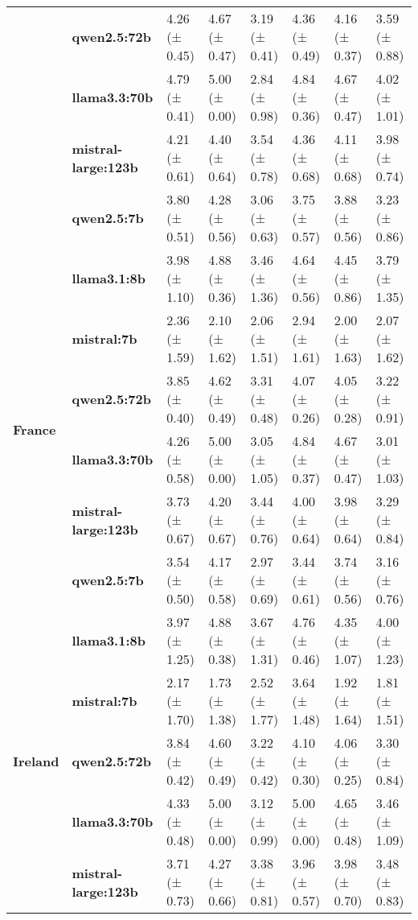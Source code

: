 \begin{longtable}{llllllll}
\textbf{} & \textbf{qwen2.5:72b} & 4.26 (± 0.45) & 4.67 (± 0.47) & 3.19 (± 0.41) & 4.36 (± 0.49) & 4.16 (± 0.37) & 3.59 (± 0.88) \\
\textbf{} & \textbf{llama3.3:70b} & 4.79 (± 0.41) & 5.00 (± 0.00) & 2.84 (± 0.98) & 4.84 (± 0.36) & 4.67 (± 0.47) & 4.02 (± 1.01) \\
\textbf{} & \textbf{mistral-large:123b} & 4.21 (± 0.61) & 4.40 (± 0.64) & 3.54 (± 0.78) & 4.36 (± 0.68) & 4.11 (± 0.68) & 3.98 (± 0.74) \\
\textbf{} & \textbf{qwen2.5:7b} & 3.80 (± 0.51) & 4.28 (± 0.56) & 3.06 (± 0.63) & 3.75 (± 0.57) & 3.88 (± 0.56) & 3.23 (± 0.86) \\
\cline{1-8}
\multirow[t]{6}{*}{\textbf{France}} & \textbf{llama3.1:8b} & 3.98 (± 1.10) & 4.88 (± 0.36) & 3.46 (± 1.36) & 4.64 (± 0.56) & 4.45 (± 0.86) & 3.79 (± 1.35) \\
\textbf{} & \textbf{mistral:7b} & 2.36 (± 1.59) & 2.10 (± 1.62) & 2.06 (± 1.51) & 2.94 (± 1.61) & 2.00 (± 1.63) & 2.07 (± 1.62) \\
\textbf{} & \textbf{qwen2.5:72b} & 3.85 (± 0.40) & 4.62 (± 0.49) & 3.31 (± 0.48) & 4.07 (± 0.26) & 4.05 (± 0.28) & 3.22 (± 0.91) \\
\textbf{} & \textbf{llama3.3:70b} & 4.26 (± 0.58) & 5.00 (± 0.00) & 3.05 (± 1.05) & 4.84 (± 0.37) & 4.67 (± 0.47) & 3.01 (± 1.03) \\
\textbf{} & \textbf{mistral-large:123b} & 3.73 (± 0.67) & 4.20 (± 0.67) & 3.44 (± 0.76) & 4.00 (± 0.64) & 3.98 (± 0.64) & 3.29 (± 0.84) \\
\textbf{} & \textbf{qwen2.5:7b} & 3.54 (± 0.50) & 4.17 (± 0.58) & 2.97 (± 0.69) & 3.44 (± 0.61) & 3.74 (± 0.56) & 3.16 (± 0.76) \\
\cline{1-8}
\multirow[t]{6}{*}{\textbf{Ireland}} & \textbf{llama3.1:8b} & 3.97 (± 1.25) & 4.88 (± 0.38) & 3.67 (± 1.31) & 4.76 (± 0.46) & 4.35 (± 1.07) & 4.00 (± 1.23) \\
\textbf{} & \textbf{mistral:7b} & 2.17 (± 1.70) & 1.73 (± 1.38) & 2.52 (± 1.77) & 3.64 (± 1.48) & 1.92 (± 1.64) & 1.81 (± 1.51) \\
\textbf{} & \textbf{qwen2.5:72b} & 3.84 (± 0.42) & 4.60 (± 0.49) & 3.22 (± 0.42) & 4.10 (± 0.30) & 4.06 (± 0.25) & 3.30 (± 0.84) \\
\textbf{} & \textbf{llama3.3:70b} & 4.33 (± 0.48) & 5.00 (± 0.00) & 3.12 (± 0.99) & 5.00 (± 0.00) & 4.65 (± 0.48) & 3.46 (± 1.09) \\
\textbf{} & \textbf{mistral-large:123b} & 3.71 (± 0.73) & 4.27 (± 0.66) & 3.38 (± 0.81) & 3.96 (± 0.57) & 3.98 (± 0.70) & 3.48 (± 0.83) \\

\end{longtable}
